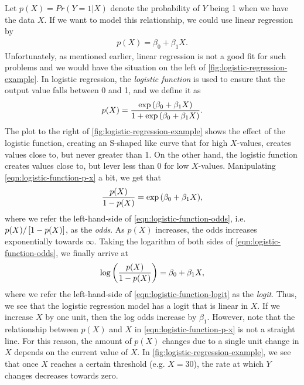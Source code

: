 Let $p(X) = Pr(Y = 1|X)$ denote the probability of $Y$ being 1 when we have the data $X$. If we want to model this relationship, we could use linear regression by
\begin{align}
    p(X) = \beta_0 + \beta_1 X.
\end{align}
Unfortunately, as mentioned earlier, linear regression is not a good fit for such problems and we would have the situation on the left of \cref{fig:logistic-regression-example}. In logistic regression, the \textit{logistic function} is used to ensure that the output value falls between 0 and 1, and we define it as
\begin{align}
    p(X) = \frac{\exp{\left(\beta_0 + \beta_1 X\right)}}{1 + \exp{\left(\beta_0 + \beta_1 X\right)}}.
    \label{eqn:logistic-function-p-x}
\end{align}
The plot to the right of \cref{fig:logistic-regression-example} shows the effect of the logistic function, creating an S-shaped like curve that for high $X$-values, creates values close to, but never greater than 1. On the other hand, the logistic function creates values close to, but lever less than 0 for low $X$-values. Manipulating \cref{eqn:logistic-function-p-x} a bit, we get that
\begin{align}
    \frac{p(X)}{1 - p(X)} = \exp{\left(\beta_0 + \beta_1 X\right)},
    \label{eqn:logistic-function-odds}
\end{align}
where we refer the left-hand-side of \cref{eqn:logistic-function-odds}, i.e. $p(X)/\left[1 - p(X)\right]$, as the \textit{odds}. As $p(X)$ increases, the odds increases exponentially towards $\infty$. Taking the logarithm of both sides of \cref{eqn:logistic-function-odds}, we finally arrive at
\begin{align}
    \log \left(\frac{p(X)}{1 - p(X)}\right) = \beta_0 + \beta_1 X,
    \label{eqn:logistic-function-logit}
\end{align}
where we refer the left-hand-side of \cref{eqn:logistic-function-logit} as the \textit{logit}. Thus, we see that the logistic regression model has a logit that is linear in $X$. If we increase $X$ by one unit, then the log odds increase by $\beta_1$. However, note that the relationship between $p(X)$ and $X$ in \cref{eqn:logistic-function-p-x} is not a straight line. For this reason, the amount of $p(X)$ changes due to a single unit change in $X$ depends on the current value of $X$. In \cref{fig:logistic-regression-example}, we see that once $X$ reaches a certain threshold (e.g. $X=30$), the rate at which $Y$ changes decreases towards zero.

